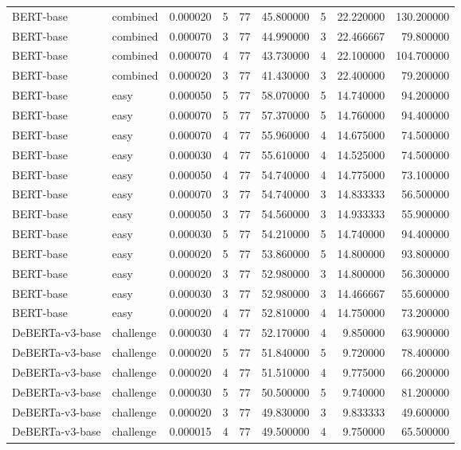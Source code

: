 \begin{tabular}{llrrrrrrr}
BERT-base & combined & 0.000020 & 5 & 77 & 45.800000 & 5 & 22.220000 & 130.200000 \\
BERT-base & combined & 0.000070 & 3 & 77 & 44.990000 & 3 & 22.466667 & 79.800000 \\
BERT-base & combined & 0.000070 & 4 & 77 & 43.730000 & 4 & 22.100000 & 104.700000 \\
BERT-base & combined & 0.000020 & 3 & 77 & 41.430000 & 3 & 22.400000 & 79.200000 \\
BERT-base & easy & 0.000050 & 5 & 77 & 58.070000 & 5 & 14.740000 & 94.200000 \\
BERT-base & easy & 0.000070 & 5 & 77 & 57.370000 & 5 & 14.760000 & 94.400000 \\
BERT-base & easy & 0.000070 & 4 & 77 & 55.960000 & 4 & 14.675000 & 74.500000 \\
BERT-base & easy & 0.000030 & 4 & 77 & 55.610000 & 4 & 14.525000 & 74.500000 \\
BERT-base & easy & 0.000050 & 4 & 77 & 54.740000 & 4 & 14.775000 & 73.100000 \\
BERT-base & easy & 0.000070 & 3 & 77 & 54.740000 & 3 & 14.833333 & 56.500000 \\
BERT-base & easy & 0.000050 & 3 & 77 & 54.560000 & 3 & 14.933333 & 55.900000 \\
BERT-base & easy & 0.000030 & 5 & 77 & 54.210000 & 5 & 14.740000 & 94.400000 \\
BERT-base & easy & 0.000020 & 5 & 77 & 53.860000 & 5 & 14.800000 & 93.800000 \\
BERT-base & easy & 0.000020 & 3 & 77 & 52.980000 & 3 & 14.800000 & 56.300000 \\
BERT-base & easy & 0.000030 & 3 & 77 & 52.980000 & 3 & 14.466667 & 55.600000 \\
BERT-base & easy & 0.000020 & 4 & 77 & 52.810000 & 4 & 14.750000 & 73.200000 \\
DeBERTa-v3-base & challenge & 0.000030 & 4 & 77 & 52.170000 & 4 & 9.850000 & 63.900000 \\
DeBERTa-v3-base & challenge & 0.000020 & 5 & 77 & 51.840000 & 5 & 9.720000 & 78.400000 \\
DeBERTa-v3-base & challenge & 0.000020 & 4 & 77 & 51.510000 & 4 & 9.775000 & 66.200000 \\
DeBERTa-v3-base & challenge & 0.000030 & 5 & 77 & 50.500000 & 5 & 9.740000 & 81.200000 \\
DeBERTa-v3-base & challenge & 0.000020 & 3 & 77 & 49.830000 & 3 & 9.833333 & 49.600000 \\
DeBERTa-v3-base & challenge & 0.000015 & 4 & 77 & 49.500000 & 4 & 9.750000 & 65.500000 \\

\end{tabular}
